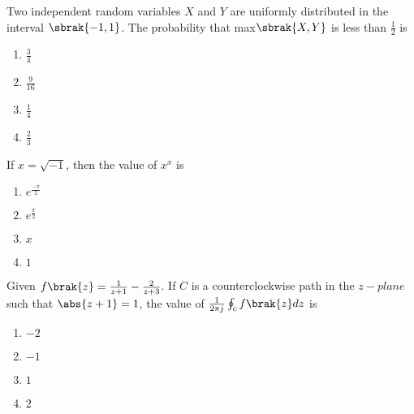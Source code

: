 \iffalse
	\title{2012-EE-1-13}
	\author{EE24Btech11006 - Arnav Mahishi}
	\section{ee}
	\chapter{2012}
\fi
\item{
Two independent random variables $X$ and $Y$ are uniformly distributed in the interval $\sbrak{-1,1}$. The probability that max$\sbrak{X,Y}$ is less than $\frac{1}{2}$ is 
\begin{multicols}{4}
\begin{enumerate}
\item $\frac{3}{4}$
\item $\frac{9}{16}$
\item $\frac{1}{4}$
\item $\frac{2}{3}$
\end{enumerate}
\end{multicols}
}
\item{
If $x=\sqrt{-1}$, then the value of $x^x$ is
\begin{multicols}{4}
\begin{enumerate}
\item $e^{\frac{-\pi}{2}}$ 
\item $e^{\frac{\pi}{2}}$ 
\item $x$
\item $1$ 
\end{enumerate}
\end{multicols}}
\item{
Given $f\brak{z}=\frac{1}{z+1}-\frac{2}{z+3}$. If $C$ is a counterclockwise path in the $z-plane$ such that $\abs{z+1}=1$, the value of $\frac{1}{2\pi j}\oint_cf\brak{z}dz$ is
\begin{multicols}{4}
\begin{enumerate}
\item $-2$
\item $-1$
\item $1$
\item $2$
\end{enumerate}
\end{multicols}
}
